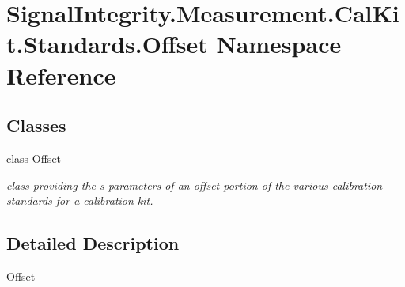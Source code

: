 \hypertarget{namespaceSignalIntegrity_1_1Measurement_1_1CalKit_1_1Standards_1_1Offset}{}\section{Signal\+Integrity.\+Measurement.\+Cal\+Kit.\+Standards.\+Offset Namespace Reference}
\label{namespaceSignalIntegrity_1_1Measurement_1_1CalKit_1_1Standards_1_1Offset}
\subsection*{Classes}
\begin{DoxyCompactItemize}
\item 
class \hyperlink{classSignalIntegrity_1_1Measurement_1_1CalKit_1_1Standards_1_1Offset_1_1Offset}{Offset}
\begin{DoxyCompactList}\small\item\em class providing the s-\/parameters of an offset portion of the various calibration standards for a calibration kit. \end{DoxyCompactList}\end{DoxyCompactItemize}


\subsection{Detailed Description}
\begin{DoxyVerb}Offset\end{DoxyVerb}
 